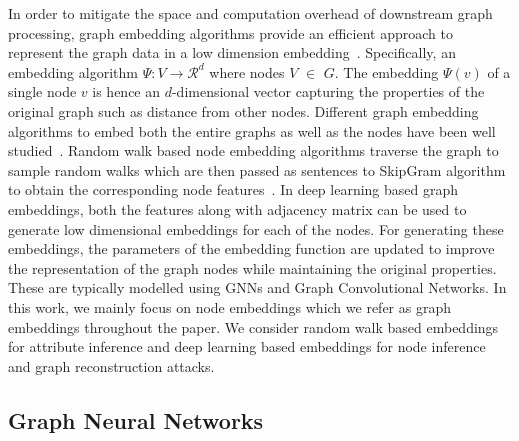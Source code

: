 In order to mitigate the space and computation overhead of downstream graph processing, graph embedding algorithms provide an efficient approach to represent the graph data in a low dimension embedding~\cite{tutorial}.
Specifically, an embedding algorithm $\Psi: V \rightarrow \mathcal{R}^d$ where nodes $V$ $\in$ $G$.
The embedding $\Psi(v)$ of a single node $v$ is hence an $d$-dimensional vector capturing the properties of the original graph such as distance from other nodes.
Different graph embedding algorithms to embed both the entire graphs as well as the nodes have been well studied~\cite{survey}.
Random walk based node embedding algorithms traverse the graph to sample random walks which are then passed as sentences to SkipGram algorithm to obtain the corresponding node features~\cite{node2vec,deepwalk}.
In deep learning based graph embeddings, both the features along with adjacency matrix can be used to generate low dimensional embeddings for each of the nodes.
For generating these embeddings, the parameters of the embedding function are updated to improve the representation of the graph nodes while maintaining the original properties.
These are typically modelled using GNNs and Graph Convolutional Networks.
In this work, we mainly focus on node embeddings which we refer as graph embeddings throughout the paper.
We consider random walk based embeddings for attribute inference and deep learning based embeddings for node inference and graph reconstruction attacks.

\subsection{Graph Neural Networks}


